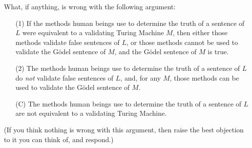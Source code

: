 \documentclass[12pt,a4paper]{article}
\begin{document}
\begin{enumerate}
What, if anything, is wrong with the following argument:
\begin{itemize}
\item[(1)] If the methods human beings use to determine the truth of a sentence of $L$ were equivalent to a validating Turing Machine $M$, then either those methods validate false sentences of $L$, or those methods cannot be used to validate the G\"odel sentence of $M$, and the G\"odel sentence of $M$ is true.
\item[(2)] The methods human beings use to determine the truth of a sentence of $L$ do \emph{not} validate false sentences of $L$, and, for any $M$, those methods can be used to validate the G\"odel sentence of $M$.
\item[(C)] The methods human beings use to determine the truth of a sentence of $L$ are not equivalent to a validating Turing Machine.
\end{itemize}

(If you think nothing is wrong with this argument, then raise the best objection to it you can think of, and respond.)

\end{enumerate}
\end{document}
